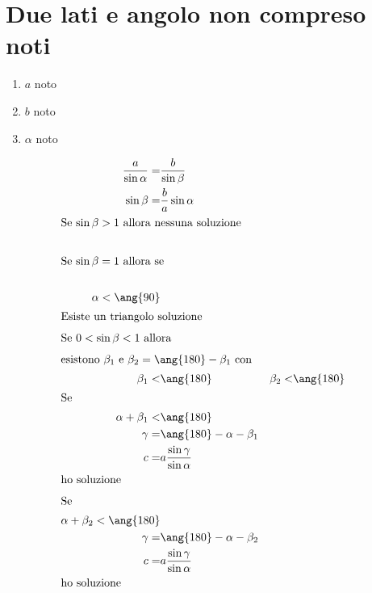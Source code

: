 \section{Due lati e angolo non compreso noti}
\begin{enumerate}
	\item $a$ noto
	\item $b$ noto
	\item $\alpha$ noto
\end{enumerate}
\begin{align*}
\frac{a}{\sin\alpha}=&\frac{b}{\sin\beta}\\
\sin\beta=&\frac{b}{a}\sin\alpha\\
\intertext{Se $\sin\beta>1$ allora nessuna soluzione}\\
\intertext{Se $\sin\beta=1$ allora se }\\
\alpha<\ang{90}\\
\intertext{Esiste un triangolo soluzione}
\intertext{Se $0<\sin\beta<1$ allora}
\intertext{esistono $\beta_1$ e $\beta_2=\ang{180}-\beta_1$ con}
\beta_1<&\ang{180}&\beta_2<&\ang{180}\\
\intertext{Se}
\alpha+\beta_1<&\ang{180}\\
\gamma=&\ang{180}-\alpha-\beta_1\\
c=&a\frac{\sin\gamma}{\sin\alpha}\\
\intertext{ho soluzione}
\intertext{Se}
\alpha+\beta_2<\ang{180}\\
\gamma=&\ang{180}-\alpha-\beta_2\\
c=&a\frac{\sin\gamma}{\sin\alpha}\\
\intertext{ho soluzione}
\end{align*}